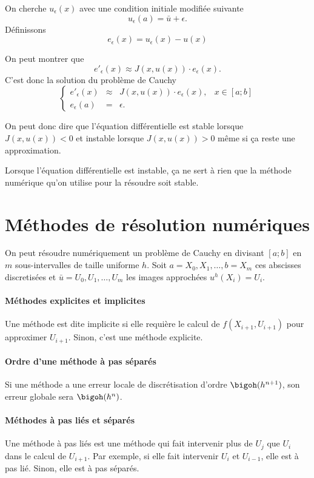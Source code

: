 On cherche $u_\epsilon(x)$ avec une condition initiale modifiée suivante
\[ u_\epsilon(a) = \bar{u} + \epsilon. \]
Définissons
\[ e_\epsilon(x) = u_\epsilon(x) - u(x) \]

On peut montrer que
\[ e'_\epsilon(x) \approx J(x, u(x))\cdot e_\epsilon(x). \]
C'est donc la solution du problème de Cauchy
\[ \left\{ \begin{array}{rclr}
    e'_\epsilon(x) & \approx & J(x, u(x)) \cdot e_\epsilon(x), & x \in [a;b]\\
    e_\epsilon(a) & = & \epsilon.
\end{array} \right. \]

On peut donc dire que l'équation différentielle est stable lorsque
$J(x, u(x)) < 0$ et instable lorsque $J(x, u(x)) > 0$
même si ça reste une approximation.

Lorsque l'équation différentielle est instable, ça ne sert à rien
que la méthode numérique qu'on utilise pour la résoudre soit stable.

\section{Méthodes de résolution numériques}
On peut résoudre numériquement un problème de Cauchy en divisant
$[a;b]$ en $m$ sous-intervalles de taille uniforme $h$.
Soit $a = X_0, X_1, \ldots, b = X_m$ ces abscisses discretisées et
$\bar{u} = U_0, U_1, \ldots, U_m$ les images approchées $u^h(X_i) = U_i$.

\paragraph{Méthodes explicites et implicites}
Une méthode est dite implicite si elle requière le calcul de
$f(X_{i+1},U_{i+1})$ pour approximer $U_{i+1}$.
Sinon, c'est une méthode explicite.

\paragraph{Ordre d'une méthode à pas séparés}
Si une méthode a une erreur locale de discrétisation d'ordre
$\bigoh(h^{n+1})$, son erreur globale sera $\bigoh(h^n)$.

\paragraph{Méthodes à pas liés et séparés}
Une méthode à pas liés est une méthode qui fait intervenir
plus de $U_j$ que $U_i$ dans le calcul de $U_{i+1}$.
Par exemple, si elle fait intervenir $U_i$ et $U_{i-1}$, elle
est à pas lié.
Sinon, elle est à pas séparés.

